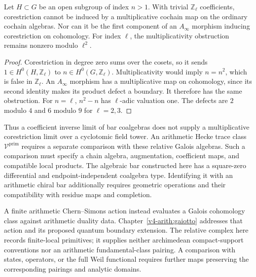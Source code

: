 \begin{proposition}\label{v4-arith:relative-bar:prop:transfer}
Let $H\subset G$ be an open subgroup of index $n>1$. With trivial
$\mathbb{Z}_\ell$ coefficients, corestriction cannot be induced by a
multiplicative cochain map on the ordinary cochain algebras. Nor can
it be the first component of an $A_\infty$ morphism inducing
corestriction on cohomology. For index $\ell$, the multiplicativity
obstruction remains nonzero modulo $\ell^2$.
\end{proposition}
\begin{proof}
Corestriction in degree zero sums over the cosets, so it sends
$1\in H^0(H,\mathbb{Z}_\ell)$ to $n\in H^0(G,\mathbb{Z}_\ell)$.
Multiplicativity would imply $n=n^2$, which is false in
$\mathbb{Z}_\ell$. An $A_\infty$ morphism has a multiplicative map on
cohomology, since its second identity makes its product defect a
boundary. It therefore has the same obstruction. For $n=\ell$,
$n^2-n$ has $\ell$-adic valuation one. The defects are $2$ modulo
$4$ and $6$ modulo $9$ for $\ell=2,3$.
\end{proof}

Thus a coefficient inverse limit of bar coalgebras does not supply a
multiplicative corestriction limit over a cyclotomic field tower.
An arithmetic Hecke trace class $\mathcal V^{\mathrm{prim}}$ requires a
separate comparison with these relative Galois algebras. Such a comparison
must specify a chain algebra, augmentation, coefficient maps, and compatible
local products. The algebraic bar constructed here has a square-zero
differential and endpoint-independent coalgebra type. Identifying it with an
arithmetic chiral bar additionally requires geometric operations and their
compatibility with residue maps and completion.

A finite arithmetic Chern--Simons action instead evaluates a Galois
cohomology class against arithmetic duality data. Chapter~\ref{v4-arith:gaiotto}
addresses that action and its proposed quantum boundary extension.
The relative complex here records finite-local primitives; it supplies
neither archimedean compact-support conventions nor an arithmetic
fundamental-class pairing. A comparison with states, operators, or the full
Weil functional requires further maps preserving the corresponding pairings
and analytic domains.
